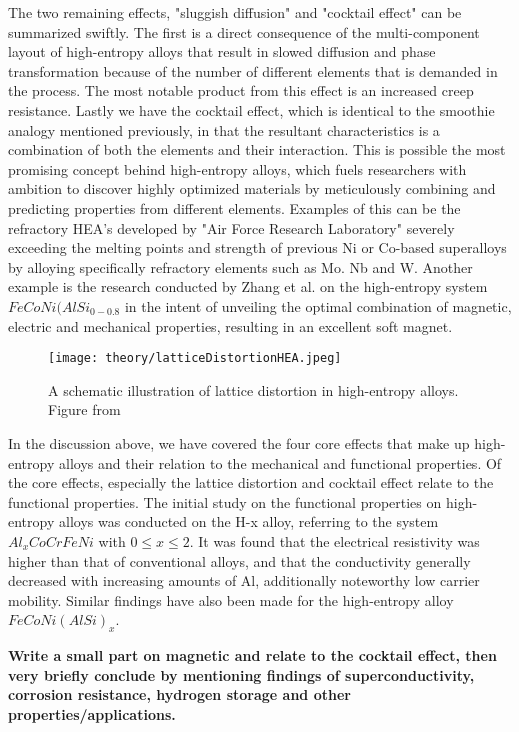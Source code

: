 The two remaining effects, "sluggish diffusion" and "cocktail effect" can be summarized swiftly. The first is a direct consequence of the multi-component layout of high-entropy alloys that result in slowed diffusion and phase transformation because of the number of different elements that is demanded in the process. The most notable product from this effect is an increased creep resistance. Lastly we have the cocktail effect, which is identical to the smoothie analogy mentioned previously, in that the resultant characteristics is a combination of both the elements and their interaction. This is possible the most promising concept behind high-entropy alloys, which fuels researchers with ambition to discover highly optimized materials by meticulously combining and predicting properties from different elements. Examples of this can be the refractory HEA's developed by "Air Force Research Laboratory" severely exceeding the melting points and strength of previous Ni or Co-based superalloys by alloying specifically refractory elements such as Mo. Nb and W. Another example is the research conducted by Zhang et al. on the high-entropy system $FeCoNi(AlSi_{0-0.8}$ in the intent of unveiling the optimal combination of magnetic, electric and mechanical properties, resulting in an excellent soft magnet. 
\begin{figure} 
\centering
\texttt{[image: theory/latticeDistortionHEA.jpeg]}
\caption{A schematic illustration of lattice distortion in high-entropy alloys. Figure from \cite{owen_jones_2018}}
\end{figure}

In the discussion above, we have covered the four core effects that make up high-entropy alloys and their relation to the mechanical and functional properties. Of the core effects, especially the lattice distortion and cocktail effect relate to the functional properties. The initial study on the functional properties on high-entropy alloys was conducted on the H-x alloy, referring to the system $Al_xCoCrFeNi$ with $0 \leq x \leq 2$. It was found that the electrical resistivity was higher than that of conventional alloys, and that the conductivity generally decreased with increasing amounts of Al, additionally noteworthy low carrier mobility. Similar findings have also been made for the high-entropy alloy $FeCoNi(AlSi)_x$. 

\textbf{Write a small part on magnetic and relate to the cocktail effect, then very briefly conclude by mentioning findings of superconductivity, corrosion resistance, hydrogen storage and other properties/applications.}